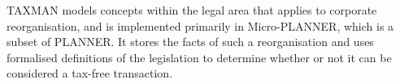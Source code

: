 \documentclass{l4proj}
\begin{document}
TAXMAN models concepts within the legal area that applies to corporate reorganisation\cite{TAXMAN}, and is implemented primarily in Micro-PLANNER, which is a subset of PLANNER. It stores the facts of such a reorganisation and uses formalised definitions of the legislation to determine whether or not it can be considered a tax-free transaction. 
\end{document}
